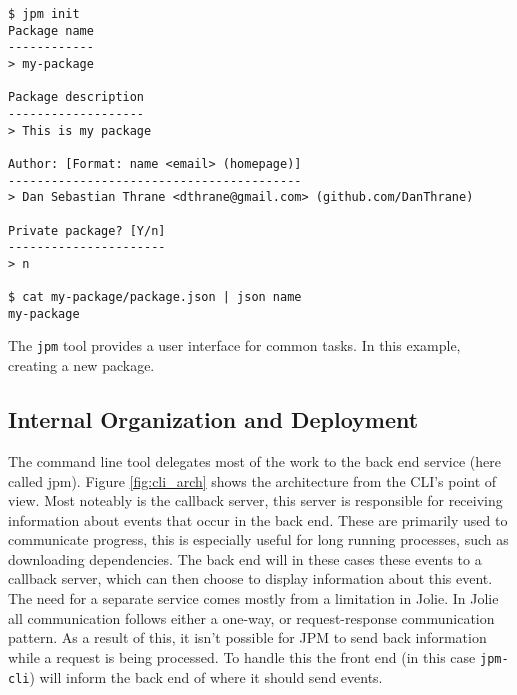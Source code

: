 \begin{listing}[H]
\begin{verbatim}
$ jpm init
Package name
------------
> my-package

Package description
-------------------
> This is my package

Author: [Format: name <email> (homepage)]
-----------------------------------------
> Dan Sebastian Thrane <dthrane@gmail.com> (github.com/DanThrane)

Private package? [Y/n]
----------------------
> n

$ cat my-package/package.json | json name
my-package
\end{verbatim}

\caption{The \texttt{jpm} tool provides a user interface for common
    tasks. In this example, creating a new package.}

\label{lst:jpm_init}

\end{listing}


\subsection{Internal Organization and Deployment}

The command line tool delegates most of the work to the back end service (here
called jpm). Figure \ref{fig:cli_arch} shows the architecture from the CLI's
point of view. Most noteably is the callback server, this server is responsible
for receiving information about events that occur in the back end. These are
primarily used to communicate progress, this is especially useful for long
running processes, such as downloading dependencies. The back end will in these
cases these events to a callback server, which can then choose to display
information about this event. The need for a separate service comes mostly from
a limitation in Jolie. In Jolie all communication follows either a one-way, or
request-response communication pattern. As a result of this, it isn't possible
for JPM to send back information while a request is being processed. To handle
this the front end (in this case \texttt{jpm-cli}) will inform the
back end of where it should send events.

